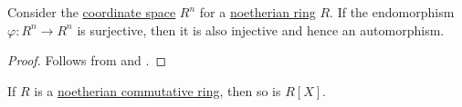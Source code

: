 \begin{proposition}\label{thm:surjective_endomorphism_in_free_module}
  Consider the \hyperref[def:sequence_space]{coordinate space} \( R^n \) for a \hyperref[def:noetherian_semiring]{noetherian ring} \( R \). If the endomorphism \( \varphi: R^n \to R^n \) is surjective, then it is also injective and hence an automorphism.
\end{proposition}
\begin{proof}
  Follows from  and .
\end{proof}

\begin{theorem}\label{thm:hilberts_basis_theorem}
  If \( R \) is a \hyperref[def:noetherian_semiring]{noetherian commutative ring}, then so is \( R[X] \).
\end{theorem}
